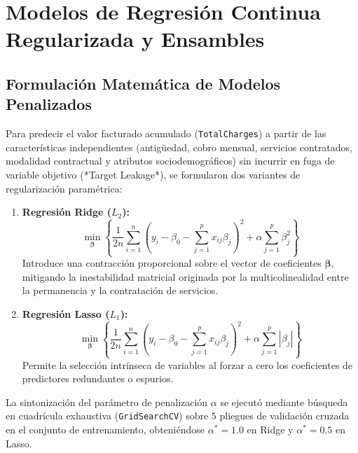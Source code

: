\documentclass[11pt,letterpaper]{article}
\begin{document}
\section{Modelos de Regresión Continua Regularizada y Ensambles}

\subsection{Formulación Matemática de Modelos Penalizados}
Para predecir el valor facturado acumulado (\texttt{TotalCharges}) a partir de las características independientes (antigüedad, cobro mensual, servicios contratados, modalidad contractual y atributos sociodemográficos) sin incurrir en fuga de variable objetivo (*Target Leakage*), se formularon dos variantes de regularización paramétrica:

\begin{enumerate}
    \item \textbf{Regresión Ridge ($L_2$):}
    \begin{equation}
        \min_{\boldsymbol{\beta}} \left\{ \frac{1}{2n} \sum_{i=1}^n \left( y_i - \beta_0 - \sum_{j=1}^p x_{ij} \beta_j \right)^2 + \alpha \sum_{j=1}^p \beta_j^2 \right\}
    \end{equation}
    Introduce una contracción proporcional sobre el vector de coeficientes $\boldsymbol{\beta}$, mitigando la inestabilidad matricial originada por la multicolinealidad entre la permanencia y la contratación de servicios.
    \item \textbf{Regresión Lasso ($L_1$):}
    \begin{equation}
        \min_{\boldsymbol{\beta}} \left\{ \frac{1}{2n} \sum_{i=1}^n \left( y_i - \beta_0 - \sum_{j=1}^p x_{ij} \beta_j \right)^2 + \alpha \sum_{j=1}^p |\beta_j| \right\}
    \end{equation}
    Permite la selección intrínseca de variables al forzar a cero los coeficientes de predictores redundantes o espurios.
\end{enumerate}

La sintonización del parámetro de penalización $\alpha$ se ejecutó mediante búsqueda en cuadrícula exhaustiva (\texttt{GridSearchCV}) sobre $5$ pliegues de validación cruzada en el conjunto de entrenamiento, obteniéndose $\alpha^* = 1.0$ en Ridge y $\alpha^* = 0.5$ en Lasso.
\end{document}
